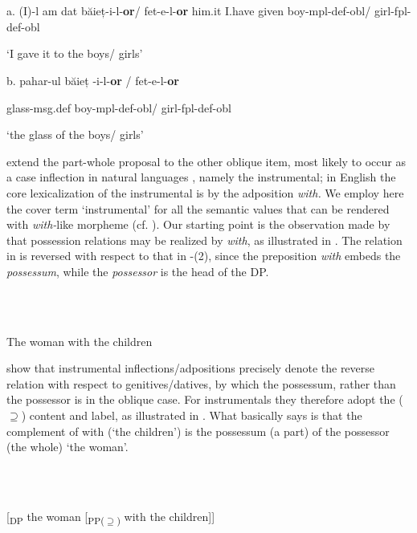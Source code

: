 \documentclass[output=paper,colorlinks,citecolor=brown]{./langscibook}
\begin{document}
\ea%
    \label{ex:key:3}
    \gll\\
        \\
    \glt
    \z

          a.   (I)-l   am   dat   băieț-i-l-\textbf{or}/     fet-e-l-\textbf{or}     him.it   I.have given   boy-mpl-def-obl/  girl-fpl-def-obl


‘I gave it to the boys/ girls’

b. pahar-ul     băieț -i-l-\textbf{or} /    fet-e-l-\textbf{or} 

glass-msg.def   boy-mpl-def-obl/  girl-fpl-def-obl 

‘the glass of the boys/ girls’ 

\citet{FrancoManzini2017b} extend the part-whole proposal to the other oblique item, most likely to occur as a case inflection in natural languages \citep{Caha2009}, namely the instrumental; in English the core lexicalization of the instrumental is by the adposition \textit{with.} We employ here the cover term ‘instrumental’ for all the semantic values that can be rendered with \textit{with-}like morpheme (cf. \citealt{StolzStrohUrdze2006}). Our starting point is the observation made by \citet{Levinson2011} that possession relations may be realized by \textit{with}, as illustrated in . The relation in  is reversed with respect to that in -(2), since the preposition \textit{with} embeds the \textit{possessum}, while the \textit{possessor} is the head of the DP.

\ea%
    \label{ex:key:4}
    \gll\\
        \\
    \glt
    \z

           The woman with the children

\citet{FrancoManzini2017b} show that instrumental inflections/adpositions precisely denote the reverse relation with respect to genitives/datives, by which the possessum, rather than the possessor is in the oblique case. For instrumentals they therefore adopt the (${\supseteq}$) content and label, as illustrated in . What  basically says is that the complement of with (‘the children’) is the possessum (a part) of the possessor (the whole) ‘the woman’.

\ea%
    \label{ex:key:5}
    \gll\\
        \\
    \glt
    \z

           [\textsubscript{DP} the woman [\textsubscript{PP(${\supseteq}$)} with the children]]
\end{document}

